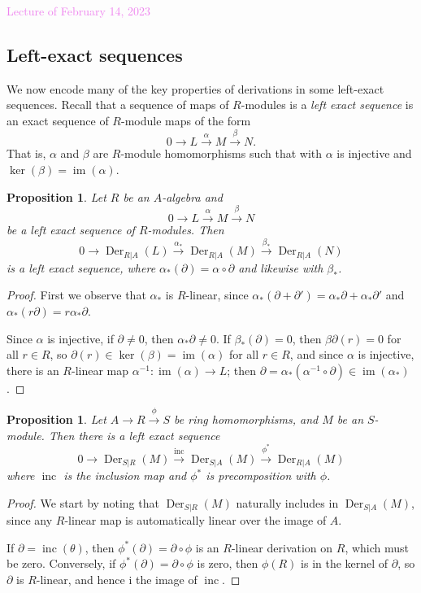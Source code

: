 \documentclass{amsart}[12pt]
\def\inc{\operatorname{inc}}
\def\Der{\operatorname{Der}}
\def\image{\operatorname{im}}
\def\im{\image}
\def\ker{\operatorname{ker}}
\newcommand{\Feb}[1]{\textcolor{violet}{Lecture of February #1, 2023}}
\numberwithin{equation}{section}
\theoremstyle{plain} %
\newtheorem{prop}[equation]{Proposition}
\theoremstyle{definition}
\theoremstyle{remark}
\newcommand{\ssec}[1]{\subsection{#1}}
\newcommand{\xra}[1]{\xrightarrow{#1}}
\begin{document}
\Feb{14}

\ssec{Left-exact sequences}

We now encode many of the key properties of derivations in some left-exact sequences. Recall that a sequence of maps of $R$-modules is  a \emph{left exact sequence} is an exact sequence of $R$-module maps of the form
\[ 0\to L \xra{\alpha} M \xra{\beta} N.\]
That is, $\alpha$ and $\beta$ are $R$-module homomorphisms such that
with $\alpha$  is injective and $\ker(\beta)=\im(\alpha)$.

\begin{prop} Let $R$ be an $A$-algebra and
\[ 0\to L \xra{\alpha} M \xra{\beta} N\]
be a left exact sequence of $R$-modules. Then
\[ 0\to \Der_{R|A}(L) \xra{\alpha_*} \Der_{R|A}(M) \xra{\beta_*} \Der_{R|A}(N)\]
is a left exact sequence, where $\alpha_*(\partial) = \alpha\circ \partial$ and likewise with $\beta_*$.
\end{prop}
\begin{proof} First we observe that $\alpha_*$ is $R$-linear, since $\alpha_*(\partial+\partial') = \alpha_*\partial + \alpha_*\partial'$ and $\alpha_*(r\partial) = r\alpha_*\partial$. 

Since $\alpha$ is injective, if $\partial\neq 0$, then $\alpha_*\partial\neq 0$. If $\beta_*(\partial)=0$, then $\beta \partial (r)=0$ for all $r\in R$, so $\partial(r)\in \ker(\beta)=\im(\alpha)$ for all $r\in R$, and since $\alpha$ is injective, there is an $R$-linear map $\alpha^{-1}:\im(\alpha) \to L$; then $\partial = \alpha_*(\alpha^{-1} \circ \partial) \in \im(\alpha_*)$.
\end{proof}

\begin{prop} Let $A\to R \xra{\phi} S$ be ring homomorphisms, and $M$ be an $S$-module. Then there is a left exact sequence
\[ 0 \to \Der_{S|R}(M) \xra{\inc} \Der_{S|A}(M) \xra{\phi^*} \Der_{R|A}(M)\]
where $\inc$ is the inclusion map and $\phi^*$ is precomposition with $\phi$.
\end{prop}
\begin{proof}
We start by noting that $\Der_{S|R}(M)$ naturally includes in $\Der_{S|A}(M)$, since any $R$-linear map is automatically linear over the image of $A$. 

If $\partial = \inc(\theta)$, then $\phi^*(\partial) = \partial \circ\phi$ is an $R$-linear derivation on $R$, which must be zero. Conversely, if $\phi^*(\partial) =  \partial \circ\phi$ is zero, then $\phi(R)$ is in the kernel of $\partial$, so $\partial$ is $R$-linear, and hence i the image of $\inc$.
\end{proof}
\end{document}
